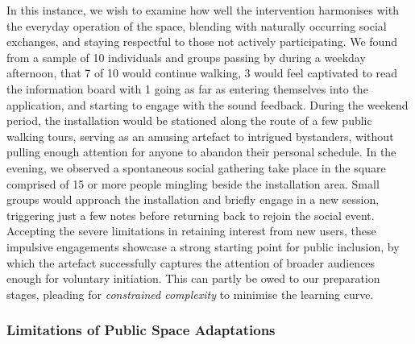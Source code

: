 In this instance, we wish to examine how well the intervention harmonises with the everyday operation of the space, blending with naturally occurring social exchanges, and staying respectful to those not actively participating. We found from a sample of 10 individuals and groups passing by during a weekday afternoon, that 7 of 10 would continue walking, 3 would feel captivated to read the information board with 1 going as far as entering themselves into the application, and starting to engage with the sound feedback. During the weekend period, the installation would be stationed along the route of a few public walking tours, serving as an amusing artefact to intrigued bystanders, without pulling enough attention for anyone to abandon their personal schedule. In the evening, we observed a spontaneous social gathering take place in the square comprised of 15 or more people mingling beside the installation area. Small groups would approach the installation and briefly engage in a new session, triggering just a few notes before returning back to rejoin the social event. Accepting the severe limitations in retaining interest from new users, these impulsive engagements showcase a strong starting point for public inclusion, by which the artefact successfully captures the attention of broader audiences enough for voluntary initiation. This can partly be owed to our preparation stages, pleading for \textit{constrained complexity} to minimise the learning curve.

\subsubsection{Limitations of Public Space Adaptations}

